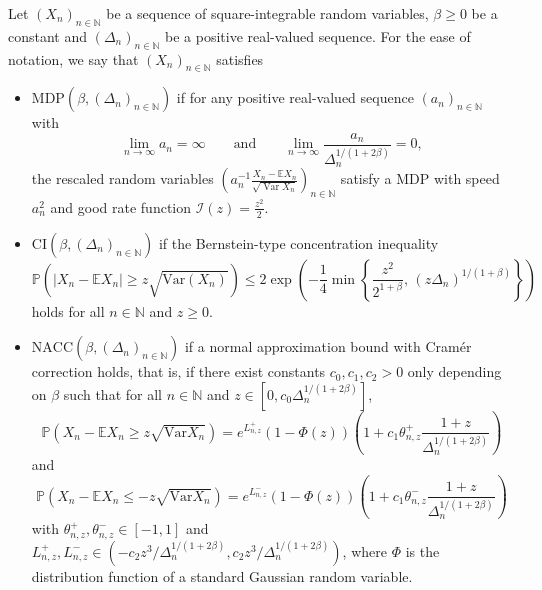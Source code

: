 \documentclass{article}
\theoremstyle{definition}
\numberwithin{equation}{section}
\theoremstyle{remark}
\newcommand{\Var}{\mathrm{Var}}
\begin{document}
Let $(X_n)_{n\in\mathbb{N}}$ be a sequence of square-integrable random variables, $\beta\ge0$ be a constant and $(\Delta_n)_{n\in\mathbb{N}}$ be a positive real-valued sequence. For the ease of notation, we say that $(X_n)_{n\in\mathbb{N}}$ satisfies
\begin{itemize}
	\item \textbf{$\mathrm{MDP}$}$(\beta,(\Delta_n)_{n\in\mathbb{N}})$
		if for any positive real-valued sequence $(a_n)_{n\in\mathbb{N}}$ with
\begin{equation*}
  \lim_{n \to \infty} a_n = \infty
\qquad \text{and} \qquad
\lim_{n \to \infty} \frac{a_n}{\Delta_n^{1/(1+2\beta)}} = 0,
\end{equation*}
the rescaled random variables
$\left( a_n^{-1} \frac{X_n - \mathbb{E} X_n}{\sqrt{\operatorname{Var} X_n}} \right)_{n \in \mathbb{N}}$
satisfy a MDP with speed $a_n^2$ and good rate function $\mathcal{I}(z) = \frac{z^2}{2}.$
\item \textbf{$\mathrm{CI}$}$(\beta, (\Delta_n)_{n \in \mathbb{N}})$ 
	if the Bernstein-type
concentration inequality
\begin{equation*}
\mathbb{P}\!\left( |X_n - \mathbb{E} X_n| \ge z \sqrt{\Var(X_n)} \right)
\le 2\exp\!\left(-\frac{1}{4}\min \left\{\frac{z^2}{2^{1+\beta}},\,(z \Delta_n)^{1/(1+\beta)}\right\}\right)
\end{equation*}
holds for all $n \in \mathbb{N}$ and $z \ge 0$.
    \item \textbf{$\mathrm{NACC}$}$(\beta, (\Delta_n)_{n \in \mathbb{N}})$ if a normal approximation bound with Cramér correction holds, that is, if there exist constants $c_0, c_1, c_2 > 0$ only depending on $\beta$ such that for all $n \in \mathbb{N}$ and $z \in \left[0, c_0 \Delta_n^{1/(1+2\beta)}\right]$,
    $$
    \mathbb{P}(X_n - \mathbb{E}X_n \geq z \sqrt{\Var X_n}) = e^{L_{n,z}^+} (1 - \Phi(z)) \left( 1 + c_1 \theta_{n,z}^+ \frac{1+z}{\Delta_n^{1/(1+2\beta)}} \right)
    $$ 
    and
    $$
    \mathbb{P}(X_n - \mathbb{E}X_n \leq -z \sqrt{\Var X_n}) = e^{L_{n,z}^-} (1 - \Phi(z)) \left( 1 + c_1 \theta_{n,z}^- \frac{1+z}{\Delta_n^{1/(1+2\beta)}} \right)
    $$ 
    with $\theta_{n,z}^+, \theta_{n,z}^- \in [-1, 1]$ and $L_{n,z}^+, L_{n,z}^- \in (-c_2 z^3 / \Delta_n^{1/(1+2\beta)}, c_2 z^3 / \Delta_n^{1/(1+2\beta)})$, where $\Phi$ is the distribution function of a standard Gaussian random variable.
\end{itemize}
\end{document}
